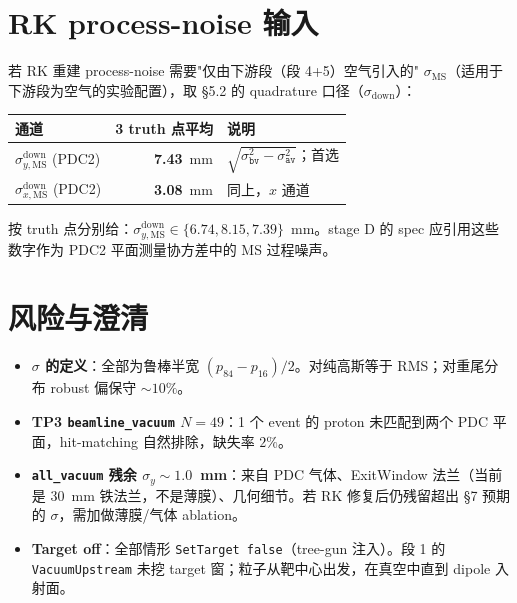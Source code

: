 \documentclass[a4paper, 11pt]{article}
\begin{document}
\section{RK process-noise 输入}

若 RK 重建 process-noise 需要"仅由下游段（段 4+5）空气引入的" $\sigma_\mathrm{MS}$（适用于下游段为空气的实验配置），取 \S 5.2 的 quadrature 口径（$\sigma_\mathrm{down}$）：

\begin{center}
\begin{tabular}{lrp{8cm}}
\toprule
通道 & 3 truth 点平均 & 说明 \\
\midrule
$\sigma_{y,\mathrm{MS}}^\mathrm{down}$ (PDC2) & \textbf{7.43}~mm & $\sqrt{\sigma_{\mathtt{bv}}^{2}-\sigma_{\mathtt{av}}^{2}}$；首选 \\
$\sigma_{x,\mathrm{MS}}^\mathrm{down}$ (PDC2) & \textbf{3.08}~mm & 同上，$x$ 通道 \\
\bottomrule
\end{tabular}
\end{center}

按 truth 点分别给：$\sigma_{y,\mathrm{MS}}^\mathrm{down} \in \{6.74, 8.15, 7.39\}$~mm。stage D 的 spec 应引用这些数字作为 PDC2 平面测量协方差中的 MS 过程噪声。

\section{风险与澄清}

\begin{itemize}[nosep]
  \item \textbf{$\sigma$ 的定义}：全部为鲁棒半宽 $(p_{84}-p_{16})/2$。对纯高斯等于 RMS；对重尾分布 robust 偏保守 $\sim 10\%$。
  \item \textbf{TP3 \texttt{beamline\_vacuum} $N=49$}：1 个 event 的 proton 未匹配到两个 PDC 平面，hit-matching 自然排除，缺失率 $2\%$。
  \item \textbf{\texttt{all\_vacuum} 残余 $\sigma_y \sim 1.0$~mm}：来自 PDC 气体、ExitWindow 法兰（当前是 $30$~mm 铁法兰，不是薄膜）、几何细节。若 RK 修复后仍残留超出 §7 预期的 $\sigma$，需加做薄膜/气体 ablation。
  \item \textbf{Target off}：全部情形 \texttt{SetTarget false}（tree-gun 注入）。段 1 的 \texttt{VacuumUpstream} 未挖 target 窗；粒子从靶中心出发，在真空中直到 dipole 入射面。
\end{itemize}
\end{document}
